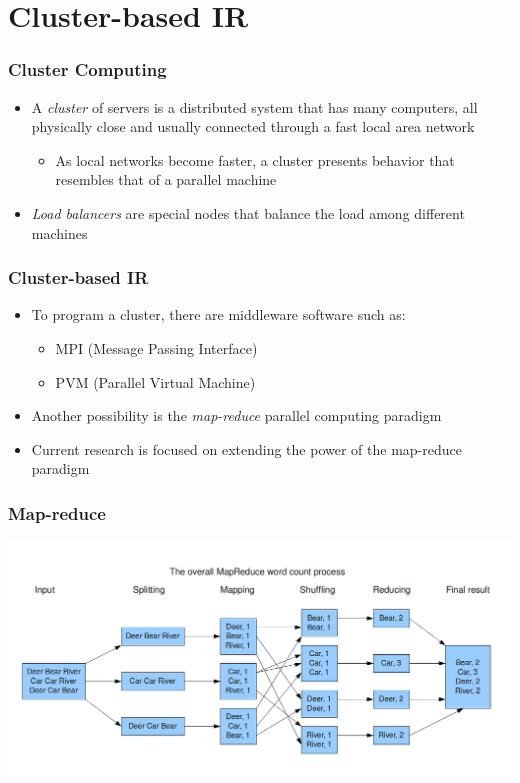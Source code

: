 \documentclass{beamer}
\begin{document}
\section{Cluster-based IR}

\begin{frame}
    \frametitle{Cluster Computing}
    \begin{itemize}
    \item A \emph{cluster} of servers is a distributed system that has many
        computers, all physically close and usually connected through a fast
        local area network
        \begin{itemize}
        \item As local networks become faster, a cluster presents behavior that
            resembles that of a parallel machine
        \end{itemize}
    \item \emph{Load balancers} are special nodes that balance the load among
        different machines
    \end{itemize}
\end{frame}

\begin{frame}
    \frametitle{Cluster-based IR}
    \begin{itemize}
    \item To program a cluster, there are middleware software such as:
        \begin{itemize}
        \item MPI (Message Passing Interface)
        \item PVM (Parallel Virtual Machine)
        \end{itemize}
    \item Another possibility is the \emph{map-reduce} parallel computing
        paradigm
    \item Current research is focused on extending the power of the map-reduce
        paradigm
    \end{itemize}
\end{frame}

\begin{frame}
    \frametitle{Map-reduce}
    
    \centering
    \includegraphics[width=\textwidth]{map-reduce}
\end{frame}
\end{document}
